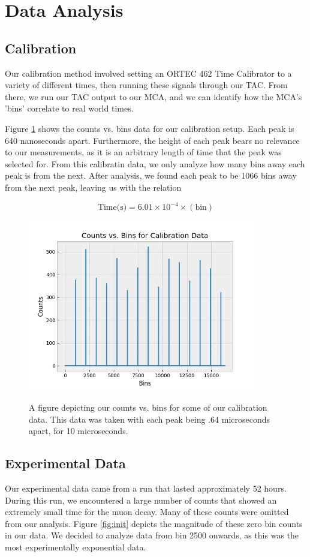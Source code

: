\documentclass[10pt,letterpaper,onecolumn]{article}
\begin{document}
\section{Data Analysis}
\subsection{Calibration}
Our calibration method involved setting an ORTEC 462 Time Calibrator to a variety of different times, then running these signals through our TAC. From there, we run our TAC output to our MCA, and we can identify how the MCA's 'bins' correlate to real world times. 

Figure \ref{fig:calib} shows the counts vs. bins data for our calibration setup. Each peak is 640 nanoseconds apart. Furthermore, the height of each peak bears no relevance to our measurements, as it is an arbitrary length of time that the peak was selected for. From this calibratin data, we only analyze how many bins away each peak is from the next. After analysis, we found each peak to be 1066 bins away from the next peak, leaving us with the relation

$$
\text{Time(s)} = 6.01 \times 10 ^ {-4} \times (\text{bin})
$$
\begin{figure}[hbt!]
    \begin{center}
        {{\includegraphics[width=10cm]{calib.png} }}%
        \caption{A figure depicting our counts vs. bins for some of our calibration data. This data was taken with each peak being .64 microseconds apart, for 10 microseconds.}%
        \label{fig:calib}%
    \end{center}
\end{figure}
\subsection{Experimental Data}
Our experimental data came from a run that lasted approximately 52 hours. During this run, we encountered a large number of counts that showed an extremely small time for the muon decay. Many of these counts were omitted from our analysis. Figure \ref{fig:init} depicts the magnitude of these zero bin counts in our data. We decided to analyze data from bin 2500 onwards, as this was the most experimentally exponential data.
\end{document}
